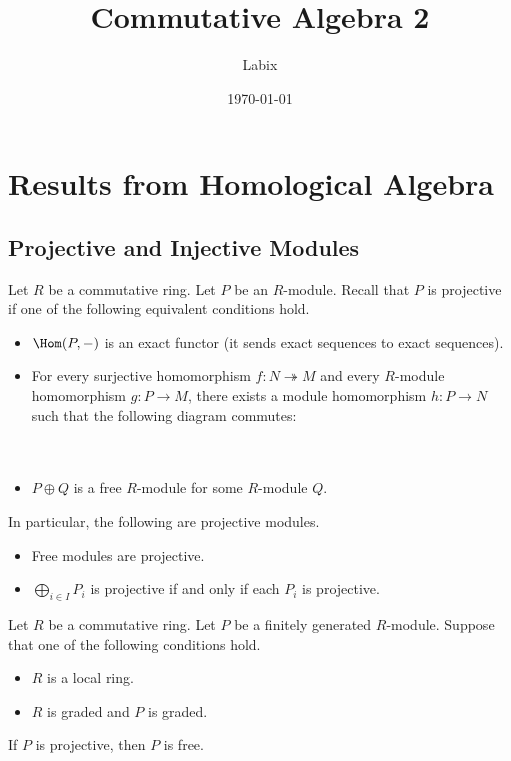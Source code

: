 \documentclass[a4paper]{article}
\title{Commutative Algebra 2}
\author{Labix}
\date{\today}
\begin{document}
\maketitle
\begin{abstract}
\end{abstract}
\pagebreak
\tableofcontents

\pagebreak
\section{Results from Homological Algebra}
\subsection{Projective and Injective Modules}
Let $R$ be a commutative ring. Let $P$ be an $R$-module. Recall that $P$ is projective if one of the following equivalent conditions hold. 
\begin{itemize}
\item $\Hom(P,-)$ is an exact functor (it sends exact sequences to exact sequences). 
\item For every surjective homomorphism $f:N\twoheadrightarrow M$ and every $R$-module homomorphism $g:P\to M$, there exists a module homomorphism $h:P\to N$ such that the following diagram commutes: \\~\\
 \\
\item $P\oplus Q$ is a free $R$-module for some $R$-module $Q$. 
\end{itemize}

In particular, the following are projective modules. 
\begin{itemize}
\item Free modules are projective. 
\item $\bigoplus_{i\in I}P_i$ is projective if and only if each $P_i$ is projective. 
\end{itemize}

\begin{prp}{}{} Let $R$ be a commutative ring. Let $P$ be a finitely generated $R$-module. Suppose that one of the following conditions hold. 
\begin{itemize}
\item $R$ is a local ring. 
\item $R$ is graded and $P$ is graded. 
\end{itemize}
If $P$ is projective, then $P$ is free. 
\end{prp}
\end{document}
